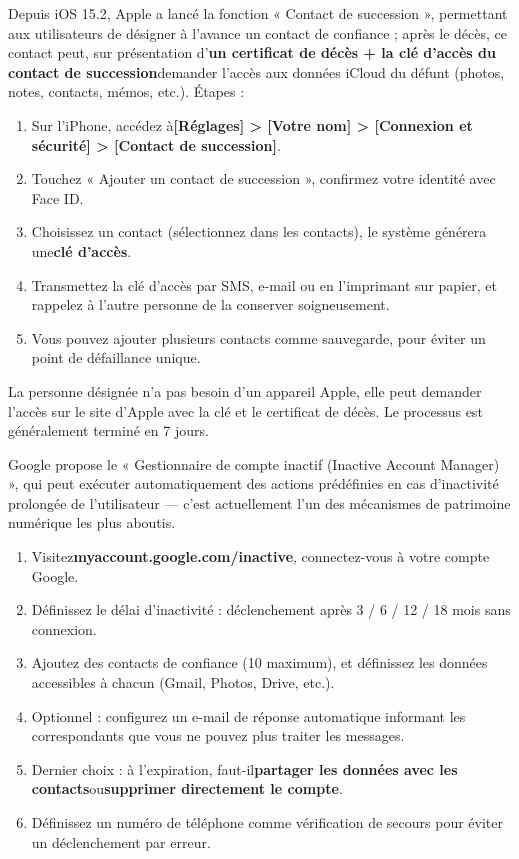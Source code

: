 
Depuis iOS 15.2, Apple a lancé la fonction « Contact de succession », permettant aux utilisateurs de désigner à l'avance un contact de confiance ; après le décès, ce contact peut, sur présentation d'\textbf{un certificat de décès + la clé d'accès du contact de succession}demander l'accès aux données iCloud du défunt (photos, notes, contacts, mémos, etc.). Étapes :

\begin{enumerate}
  \item Sur l'iPhone, accédez à\textbf{[Réglages] > [Votre nom] > [Connexion et sécurité] > [Contact de succession]}.
  \item Touchez « Ajouter un contact de succession », confirmez votre identité avec Face ID.
  \item Choisissez un contact (sélectionnez dans les contacts), le système générera une\textbf{clé d'accès}.
  \item Transmettez la clé d'accès par SMS, e-mail ou en l'imprimant sur papier, et rappelez à l'autre personne de la conserver soigneusement.
  \item Vous pouvez ajouter plusieurs contacts comme sauvegarde, pour éviter un point de défaillance unique.
\end{enumerate}

La personne désignée n'a pas besoin d'un appareil Apple, elle peut demander l'accès sur le site d'Apple avec la clé et le certificat de décès. Le processus est généralement terminé en 7 jours.


Google propose le « Gestionnaire de compte inactif (Inactive Account Manager) », qui peut exécuter automatiquement des actions prédéfinies en cas d'inactivité prolongée de l'utilisateur — c'est actuellement l'un des mécanismes de patrimoine numérique les plus aboutis.

\begin{enumerate}
  \item Visitez\textbf{myaccount.google.com/inactive}, connectez-vous à votre compte Google.
  \item Définissez le délai d'inactivité : déclenchement après 3 / 6 / 12 / 18 mois sans connexion.
  \item Ajoutez des contacts de confiance (10 maximum), et définissez les données accessibles à chacun (Gmail, Photos, Drive, etc.).
  \item Optionnel : configurez un e-mail de réponse automatique informant les correspondants que vous ne pouvez plus traiter les messages.
  \item Dernier choix : à l'expiration, faut-il\textbf{partager les données avec les contacts}ou\textbf{supprimer directement le compte}.
  \item Définissez un numéro de téléphone comme vérification de secours pour éviter un déclenchement par erreur.
\end{enumerate}

